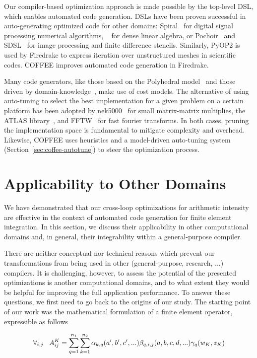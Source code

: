 Our compiler-based optimization approach is made possible by the top-level DSL, which enables automated code generation. DSLs have been proven successful in auto-generating optimized code for other domains: Spiral~\citep{Pueschel:05} for digital signal processing numerical algorithms, ~\citep{Spampinato:14} for dense linear algebra, or Pochoir~\citep{pochoir} and SDSL~\citep{stencil-compiler} for image processing and finite difference stencils. Similarly, PyOP2 is used by Firedrake to express iteration over unstructured meshes in scientific codes. COFFEE improves automated code generation in Firedrake.

Many code generators, like those based on the Polyhedral model~\citep{pluto} and those driven by domain-knowledge~\citep{modeldriven}, make use of cost models. The alternative of using auto-tuning to select the best implementation for a given problem on a certain platform has been adopted by nek5000~\citep{nek5000} for small matrix-matrix multiplies, the ATLAS library~\citep{ATLAS}, and FFTW~\citep{FFTW} for fast fourier transforms. In both cases, pruning the implementation space is fundamental to mitigate complexity and overhead. Likewise, COFFEE uses heuristics and a model-driven auto-tuning system (Section~\ref{sec:coffee-autotune}) to steer the optimization process.


\section{Applicability to Other Domains}
\label{sec:generality}
We have demonstrated that our cross-loop optimizations for arithmetic intensity are effective in the context of automated code generation for finite element integration. In this section, we discuss their applicability in other computational domains and, in general, their integrability within a general-purpose compiler.

There are neither conceptual nor technical reasons which prevent our transformations from being used in other (general-purpose, research, ...) compilers. It is challenging, however, to assess the potential of the presented optimizations is another computational domains, and to what extent they would be helpful for improving the full application performance. To answer these questions, we first need to go back to the origins of our study. The starting point of our work was the mathematical formulation of a finite element operator, expressible as follows

\begin{equation}
\label{eq:assembly-model}
\scriptsize
\forall_{i, j} ~~~ A_{ij}^K = \sum_{q=1}^{n_1} \sum_{k=1}^{n_2} \alpha_{k, q}(a', b', c', ...) \beta_{q, i, j}(a, b, c, d, ...) \gamma_{q}(w_K, z_K)
\end{equation}

